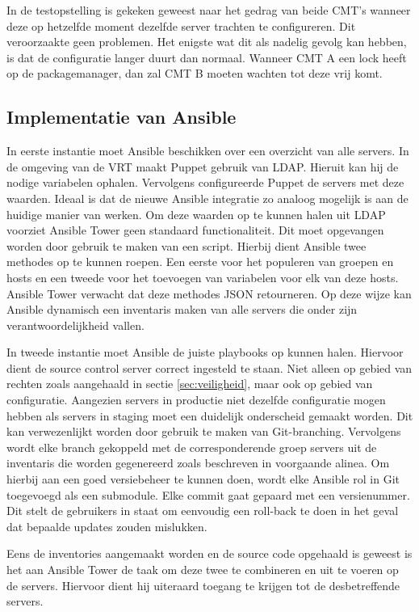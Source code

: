 In de testopstelling is gekeken geweest naar het gedrag van beide \gls{CMT}'s wanneer deze op hetzelfde moment dezelfde server trachten te configureren. Dit veroorzaakte geen problemen.
Het enigste wat dit als nadelig gevolg kan hebben, is dat de configuratie langer duurt dan normaal. Wanneer \gls{CMT} A een lock heeft op de \gls{packagemanager}, dan zal \gls{CMT} B moeten wachten tot deze vrij komt. 

\subsection{Implementatie van Ansible}
In eerste instantie moet Ansible beschikken over een overzicht van alle servers. In de omgeving van de VRT maakt Puppet gebruik van \gls{LDAP}. Hieruit kan hij de nodige variabelen ophalen. Vervolgens configureerde Puppet de servers met deze waarden. Ideaal is dat de nieuwe Ansible integratie zo analoog mogelijk is aan de huidige manier van werken. Om deze waarden op te kunnen halen uit \gls{LDAP} voorziet Ansible Tower geen standaard functionaliteit. Dit moet opgevangen worden door gebruik te maken van een script. Hierbij dient Ansible twee methodes op te kunnen roepen. Een eerste voor het populeren van groepen en hosts en een tweede voor het toevoegen van variabelen voor elk van deze hosts. Ansible Tower verwacht dat deze methodes JSON retourneren. Op deze wijze kan Ansible dynamisch een inventaris maken van alle servers die onder zijn verantwoordelijkheid vallen.

In tweede instantie moet Ansible de juiste playbooks op kunnen halen. Hiervoor dient de source control server correct ingesteld te staan. Niet alleen op gebied van rechten zoals aangehaald in sectie \ref{sec:veiligheid}, maar ook op gebied van configuratie. Aangezien servers in productie niet dezelfde configuratie mogen hebben als servers in staging moet een duidelijk onderscheid gemaakt worden. Dit kan verwezenlijkt worden door gebruik te maken van \gls{Git-branch}ing. Vervolgens wordt elke branch gekoppeld met de corresponderende groep servers uit de inventaris die worden gegenereerd zoals beschreven in voorgaande alinea. Om hierbij aan een goed versiebeheer te kunnen doen, wordt elke Ansible rol in \gls{Git} toegevoegd als een \gls{submodule}. Elke commit gaat gepaard met een versienummer. Dit stelt de gebruikers in staat om eenvoudig een roll-back te doen in het geval dat bepaalde updates zouden mislukken.

Eens de inventories aangemaakt worden en de source code opgehaald is geweest is het aan Ansible Tower de taak om deze twee te combineren en uit te voeren op de servers. Hiervoor dient hij uiteraard toegang te krijgen tot de desbetreffende servers.

